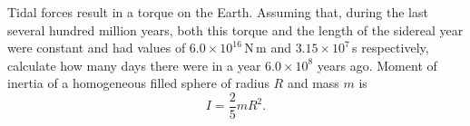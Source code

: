 Tidal forces result in a torque on the Earth. Assuming that, during the last
several hundred million years, both this torque and the length of the sidereal
year were constant and had values of $6.0 \times 10^{16}$\,N\,m and
$3.15 \times 10^{7}$\,s respectively, calculate how many days there were in a
year $6.0 \times 10^{8}$ years ago. Moment of inertia of a homogeneous filled
sphere of radius $R$ and mass $m$ is
\[ I = \frac{2}{5} m R^2. \]
